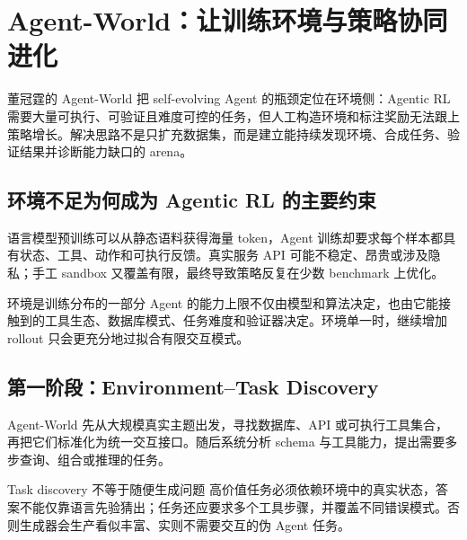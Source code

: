 \section{Agent-World：让训练环境与策略协同进化}

董冠霆的 Agent-World 把 self-evolving Agent 的瓶颈定位在环境侧：Agentic RL 需要大量可执行、可验证且难度可控的任务，但人工构造环境和标注奖励无法跟上策略增长。解决思路不是只扩充数据集，而是建立能持续发现环境、合成任务、验证结果并诊断能力缺口的 arena。


\subsection{环境不足为何成为 Agentic RL 的主要约束}

语言模型预训练可以从静态语料获得海量 token，Agent 训练却要求每个样本都具有状态、工具、动作和可执行反馈。真实服务 API 可能不稳定、昂贵或涉及隐私；手工 sandbox 又覆盖有限，最终导致策略反复在少数 benchmark 上优化。


\begin{importantbox}{环境是训练分布的一部分}
Agent 的能力上限不仅由模型和算法决定，也由它能接触到的工具生态、数据库模式、任务难度和验证器决定。环境单一时，继续增加 rollout 只会更充分地过拟合有限交互模式。
\end{importantbox}

\subsection{第一阶段：Environment--Task Discovery}

Agent-World 先从大规模真实主题出发，寻找数据库、API 或可执行工具集合，再把它们标准化为统一交互接口。随后系统分析 schema 与工具能力，提出需要多步查询、组合或推理的任务。


\begin{knowledgebox}{Task discovery 不等于随便生成问题}
高价值任务必须依赖环境中的真实状态，答案不能仅靠语言先验猜出；任务还应要求多个工具步骤，并覆盖不同错误模式。否则生成器会生产看似丰富、实则不需要交互的伪 Agent 任务。
\end{knowledgebox}

